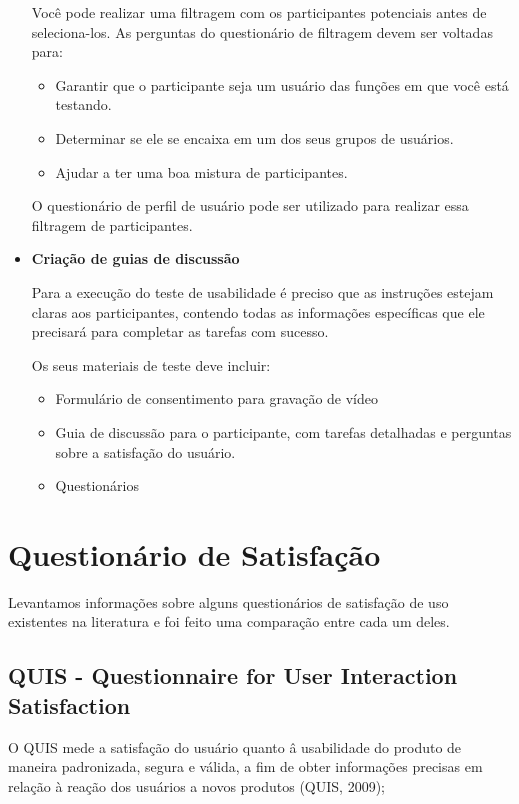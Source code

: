 \begin{itemize}
Você pode realizar uma filtragem com os participantes potenciais antes de seleciona-los. As perguntas do questionário de filtragem devem ser voltadas para:

	\begin{itemize}
	\item Garantir que o participante seja um usuário das funções em que você está testando.
	\item Determinar se ele se encaixa em um dos seus grupos de usuários.
	\item Ajudar a ter uma boa mistura de participantes.
	\end{itemize}	

O questionário de perfil de usuário pode ser utilizado para realizar essa filtragem de participantes.


\item \textbf{Criação de guias de discussão}

Para a execução do teste de usabilidade é preciso que as instruções estejam claras aos participantes, contendo todas as informações específicas que ele precisará para completar as tarefas com sucesso.

Os seus materiais de teste deve incluir:

		\begin{itemize}
		\item Formulário de consentimento para gravação de vídeo
		\item Guia de discussão para o participante, com tarefas detalhadas e perguntas sobre a satisfação do usuário.
		\item Questionários
		\end{itemize}
		
\end{itemize}


\section{Questionário de Satisfação}

	Levantamos informações sobre alguns questionários de satisfação de uso existentes na literatura e foi feito uma comparação entre cada um deles.

\subsection{QUIS - Questionnaire for User Interaction Satisfaction}

	O QUIS mede a satisfação do usuário quanto â usabilidade do produto de maneira padronizada, segura e válida, a fim de obter informações precisas em relação à reação dos usuários a novos produtos (QUIS, 2009);

